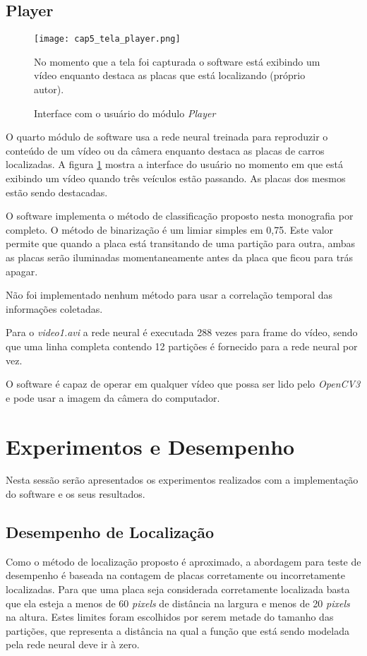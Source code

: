 \subsection{Player}

\begin{figure}[!htb]
	\centering
	\texttt{[image: cap5\_tela\_player.png]}
	\caption{Interface com o usuário do módulo \emph{Player}}
	\label{fig:cap5_tela_player}
	No momento que a tela foi capturada o software está exibindo um vídeo
	enquanto destaca as placas que está localizando (próprio autor).
\end{figure}

O quarto módulo de software usa a rede neural treinada para reproduzir o
conteúdo de um vídeo ou da câmera enquanto destaca as placas de carros
localizadas. A figura \ref{fig:cap5_tela_player} mostra a interface do usuário
no momento em que está exibindo um vídeo quando três veículos estão passando.
As placas dos mesmos estão sendo destacadas.

O software implementa o método de classificação proposto nesta monografia por
completo. O método de binarização é um limiar simples em 0,75. Este valor
permite que quando a placa está transitando de uma partição para outra, ambas
as placas serão iluminadas momentaneamente antes da placa que ficou para trás
apagar.

Não foi implementado nenhum método para usar a correlação temporal das
informações coletadas.

Para o \emph{video1.avi} a rede neural é executada 288 vezes para frame do
vídeo, sendo que uma linha completa contendo 12 partições é fornecido para a
rede neural por vez.

O software é capaz de operar em qualquer vídeo que possa ser lido pelo
\emph{OpenCV3} e pode usar a imagem da câmera do computador.

\section{Experimentos e Desempenho}

Nesta sessão serão apresentados os experimentos realizados com a implementação
do software e os seus resultados.

\subsection{Desempenho de Localização}

Como o método de localização proposto é aproximado, a abordagem para teste de
desempenho é baseada na contagem de placas corretamente ou
incorretamente localizadas. Para que uma placa seja considerada corretamente
localizada basta que ela esteja a menos de 60 \emph{pixels} de distância na
largura e menos de 20 \emph{pixels} na altura. Estes limites foram escolhidos
por serem metade do tamanho das partições, que representa a distância na qual
a função que está sendo modelada pela rede neural deve ir à zero.
	
